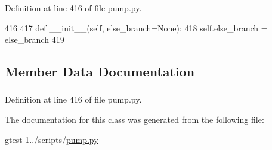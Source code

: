 \-Definition at line 416 of file pump.\-py.


\begin{DoxyCode}
416 
417   def __init__(self, else_branch=None):
418     self.else_branch = else_branch
419 

\end{DoxyCode}


\subsection{\-Member \-Data \-Documentation}
\hypertarget{classpump_1_1ElseNode_a0a80780690b731c57dfe91bab6338474}{
\subsubsection[{else\-\_\-branch}]{}}\label{da/dc2/classpump_1_1ElseNode_a0a80780690b731c57dfe91bab6338474}


\-Definition at line 416 of file pump.\-py.



\-The documentation for this class was generated from the following file\-:\begin{DoxyCompactItemize}
\item 
gtest-\/1../scripts/\hyperlink{pump_8py}{pump.\-py}\end{DoxyCompactItemize}
